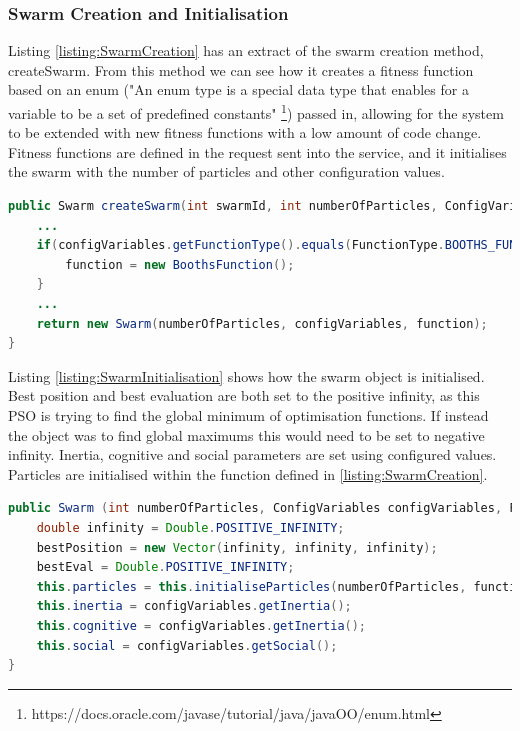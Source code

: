 \documentclass[oneside,12pt]{book}
\begin{document}
\subsubsection{Swarm Creation and Initialisation}
Listing \ref{listing:SwarmCreation} has an extract of the swarm creation method, createSwarm. From this method we can see how it creates a fitness function based on an enum ("An enum type is a special data type that enables for a variable to be a set of predefined constants" \footnote{https://docs.oracle.com/javase/tutorial/java/javaOO/enum.html}) passed in, allowing for the system to be extended with new fitness functions with a low amount of code change. Fitness functions are defined in the request sent into the service, and it initialises the swarm with the number of particles and other configuration values.

\begin{lstlisting}[basicstyle=\footnotesize, language=Java]
public Swarm createSwarm(int swarmId, int numberOfParticles, ConfigVariables configVariables) throws Exception {
    ...
    if(configVariables.getFunctionType().equals(FunctionType.BOOTHS_FUNCTION)){
        function = new BoothsFunction();
    } 
    ...
    return new Swarm(numberOfParticles, configVariables, function);
}
\end{lstlisting}
\label{listing:SwarmCreation}

Listing \ref{listing:SwarmInitialisation} shows how the swarm object is initialised. Best position and best evaluation are both set to the positive infinity, as this PSO is trying to find the global minimum of optimisation functions. If instead the object was to find global maximums this would need to be set to negative infinity. Inertia, cognitive and social parameters are set using configured values. Particles are initialised within the function defined in \ref{listing:SwarmCreation}.

\begin{lstlisting}[basicstyle=\footnotesize, language=Java]
public Swarm (int numberOfParticles, ConfigVariables configVariables, Function function) {
    double infinity = Double.POSITIVE_INFINITY;
    bestPosition = new Vector(infinity, infinity, infinity);
    bestEval = Double.POSITIVE_INFINITY;
    this.particles = this.initialiseParticles(numberOfParticles, function);
    this.inertia = configVariables.getInertia();
    this.cognitive = configVariables.getInertia();
    this.social = configVariables.getSocial();
}
\end{lstlisting}
\label{listing:SwarmInitialisation}
\end{document}
